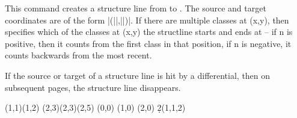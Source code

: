 \documentclass{ltxdoc}
\begin{document}
\begin{sseqdata}[name=ex1,degree={#1}{1-#1}]
\begin{command}{\structline{}}
This command creates a structure line from  to . The source and target coordinates are of the form |(||,||)|. If there are multiple classes at (x,y), then  specifies which of the classes at (x,y) the structline starts and ends at -- if n is positive, then it counts from the first class in that position, if n is negative, it counts backwards from the most recent.

If the source or target of a structure line is hit by a differential, then on subsequent pages, the structure line disappears.
\begin{codeexample}[width=9cm]
\sseqnewgroup{}
\begin{sseqdata}[name=structline example,
                 classes={circle,fill},
                 Adams grading, no axes]
\class(1,1)\class(1,2)
\class(2,3)\class(2,3)\class(2,5)
\tower[classes=blue](0,0)
\tower[struct lines=dashed,orange](1,0)
\tower[struct lines=red](2,0)
\d2(1,1,2)
\end{sseqdata}
\printpage[name=structline example,page=2]
\hskip1cm
\printpage[name=structline example,page=3]
\end{codeexample}
\end{command}

\begin{command}{}

\end{command}


\end{sseqdata}
\end{document}
